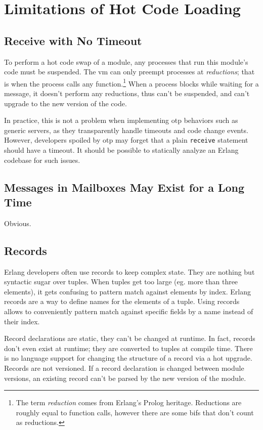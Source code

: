 \section{Limitations of Hot Code Loading}

\subsection{Receive with No Timeout}

To perform a hot code swap of a module, any processes that run this module's code must be suspended. The \acrshort{vm} can only preempt processes at \emph{reductions}; that is when the process calls any function.\footnote{The term \emph{reduction} comes from Erlang's Prolog heritage. Reductions are roughly equal to function calls, however there are some \acrshort{bif}s that don't count as reductions.} When a process blocks while waiting for a message, it doesn't perform any reductions,  thus can't be suspended, and can't upgrade to the new version of the code.

In practice, this is not a problem when implementing \acrshort{otp} behaviors such as generic servers, as they transparently handle timeouts and code change events. However, developers spoiled by \acrshort{otp} may forget that a plain \lstinline|receive| statement should have a timeout. It should be possible to statically analyze an Erlang codebase for such issues.


\subsection{Messages in Mailboxes May Exist for a Long Time}

Obvious.


\subsection{Records}

Erlang developers often use records to keep complex state. They are nothing but syntactic sugar over tuples. When tuples get too large (eg. more than three elements), it gets confusing to pattern match against elements by index. Erlang records are a way to define names for the elements of a tuple. Using records allows to conveniently pattern match against specific fields by a name instead of their index.

Record declarations are static, they can't be changed at runtime. In fact, records don't even exist at runtime; they are converted to tuples at compile time. There is no language support for changing the structure of a record via a hot upgrade. Records are not versioned. If a record declaration is changed between module versions, an existing record can't be parsed by the new version of the module.

